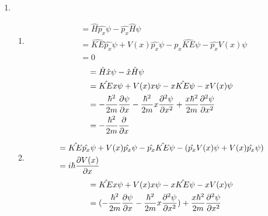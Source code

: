 \begin{solution}\
    \begin{enumerate}
        \item \begin{enumerate}
                  \item \begin{align*}
                            [\hat{H},\hat{p_x}] & =\hat{H}\hat{p_x}\psi-\hat{p_x}\hat{H}\psi                                       \\
                                                & =\hat{KE}\hat{p_x}\psi+V(x)\hat{p_x}\psi-\hat{p_x}\hat{KE}\psi-\hat{p_x}V(x)\psi \\
                                                & =0
                        \end{align*}
                        \begin{align*}
                            [\hat{H},\hat{x}] & =\hat{H}\hat{x}\psi-\hat{x}\hat{H}\psi                            \\
                                              & =\hat{KE}x\psi+V(x)x\psi-x\hat{KE}\psi-xV(x)\psi                  \\
                                              & =-\frac{\hbar^2}{2m}\pd{\psi}{x}-\frac{\hbar^2}{2m}x\pdd{\psi}{x}
                            +\frac{x\hbar^2}{2m}\pdd{\psi}{x}                                                     \\
                                              & =-\frac{\hbar^2}{2m}\pd{}{x}
                        \end{align*}
                  \item \begin{align*}
                            [\hat{H},\hat{p_x}] & =\hat{KE}\hat{p_x}\psi+V(x)\hat{p_x}\psi-\hat{p_x}\hat{KE}\psi-
                            (\hat{p_x}V(x)\psi+V(x)\hat{p_x}\psi)                                                 \\
                                                & =i\hbar\pd{V(x)}{x}
                        \end{align*}
                        \begin{align*}
                            [\hat{H},\hat{x}] & =\hat{KE}x\psi+V(x)x\psi-x\hat{KE}\psi-xV(x)\psi                     \\
                                              & =(-\frac{\hbar^2}{2m}\pd{\psi}{x}-\frac{\hbar^2}{2m}x\pdd{\psi}{x})+
                            \frac{x\hbar^2}{2m}\pdd{\psi}{x}                                                         \\

\end{align*}
\end{enumerate}
\end{enumerate}
\end{solution}
